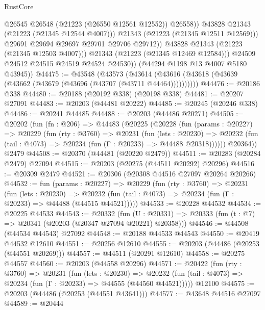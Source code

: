 \begin{lexlean}{RustCore}
\begin{coremodule}
                          @26545
                          @26548
                          (@21223 (@26550 @12561 @12552))
                          @26558))
                      @43828
                      @21343
                      (@21223 (@21345 @12544 @4007)))
                    @21343
                    (@21223 (@21345 @12511 @12569)))
                  @29691
                  @29694
                  @29697
                  @29701
                  @29706
                  @29712))
              @43828
              @21343
              (@21223 (@21345 @12503 @4007)))
            @21343
            (@21223 (@21345 @12469 @12584)))
          @24509
          @24512
          @24515
          @24519
          @24524
          @24530))
      (@44294 @1198 @13 @4007 @5180 @43945))
@44475 := @43548
    (@43573 (@43614 (@43616 (@43618 (@43639 (@43662 (@43679 (@43696 (@43707 (@43711 @44464))))))))))
@44476 := @20186 @338
@44480 := @20188 (@20192 @338) (@20198 @338)
@44481 := @20207 @27091
@44483 := @20203 (@44481 @20222)
@44485 := @20245 (@20246 @338)
@44486 := @20241 @44485
@44488 := @20203 (@44486 @20271)
@44505 := @20202
    (fun (fn : @206) =>
    @44483
      (@20225
        (@20228
          (fun (params : @20227) =>
          @20229
            (fun (rty : @3760) =>
            @20231
              (fun (lets : @20230) =>
              @20232 (fun (tail : @4073) => @20234 (fun (Γ : @20233) => @44488 @20318))))))
        @20364))
    @2479
@44508 := @20370 (@44481 (@20220 @2479))
@44511 := @20283 (@20284 @2479) @27094
@44515 := @20203 (@20275 (@44511 @20292) @20296)
@44516 := @20309 @2479
@44521 := @20306 (@20308 @44516 @27097 @20264 @20266)
@44532 := fun (params : @20227) =>
  @20229
    (fun (rty : @3760) =>
    @20231
      (fun (lets : @20230) =>
      @20232 (fun (tail : @4073) => @20234 (fun (Γ : @20233) => @44488 (@44515 @44521)))))
@44533 := @20228 @44532
@44534 := @20225 @44533
@44543 := @20332
    (fun (U : @20331) => @20333 (fun (t : @7) => @20341 (@20203 (@20347 @27094 @20221) @20358)))
@44546 := @44508 (@44534 @44543) @27092
@44548 := @20188 @44533 @44543
@44550 := @20419 @44532 @12610
@44551 := @20256 @12610
@44555 := @20203 (@44486 (@20253 (@44551 @20269)))
@44557 := @44511 (@20291 @12610)
@44558 := @20275 @44557
@44560 := @20203 (@44558 @20296)
@44571 := @20422
    (fun (rty : @3760) =>
    @20231
      (fun (lets : @20230) =>
      @20232 (fun (tail : @4073) => @20234 (fun (Γ : @20233) => @44555 (@44560 @44521)))))
    @12100
@44575 := @20203 (@44486 (@20253 (@44551 @43641)))
@44577 := @43648 @44516 @27097
@44589 := @20444

\end{coremodule}
\end{lexlean}
